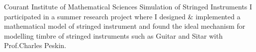 {Courant Institute of Mathematical Sciences}
{Simulation of Stringed Instruments}
{
	I participated in a summer research project where I designed \& implemented a mathematical model of stringed instrument and found the ideal mechanism for modelling timbre of stringed instruments such as Guitar and Sitar with Prof.Charles Peskin.
}
